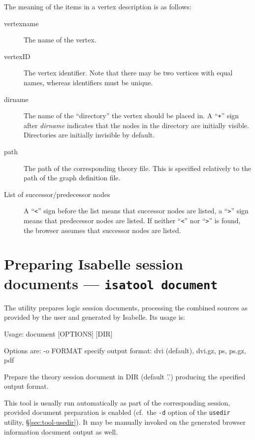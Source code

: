 The meaning of the items in a vertex description is as follows:
\begin{description}
  
\item[vertexname] The name of the vertex.
  
\item[vertexID] The vertex identifier. Note that there may be two
  vertices with equal names, whereas identifiers must be unique.
  
\item[dirname] The name of the ``directory'' the vertex should be
  placed in.  A ``{\tt +}'' sign after {\it dirname} indicates that
  the nodes in the directory are initially visible. Directories are
  initially invisible by default.
  
\item[path] The path of the corresponding theory file. This is
  specified relatively to the path of the graph definition file.
  
\item[List of successor/predecessor nodes] A ``{\tt <}'' sign before
  the list means that successor nodes are listed, a ``{\tt >}'' sign
  means that predecessor nodes are listed. If neither ``{\tt <}'' nor
  ``{\tt >}'' is found, the browser assumes that successor nodes are
  listed.

\end{description}


\section{Preparing Isabelle session documents --- \texttt{isatool document}}
\label{sec:tool-document}

The  utility prepares logic session documents, processing the
combined sources as provided by the user and generated by Isabelle.  Its usage is:
\begin{ttbox}
Usage: document [OPTIONS] [DIR]

  Options are:
    -o FORMAT    specify output format: dvi (default), dvi.gz, ps,
                 ps.gz, pdf

  Prepare the theory session document in DIR (default '.')
  producing the specified output format.
\end{ttbox}
This tool is usually run automatically as part of the corresponding session,
provided document preparation is enabled (cf.\ the \texttt{-d} option of the
\texttt{usedir} utility, \S\ref{sec:tool-usedir}).  It may be manually invoked
on the generated browser information document output as well.

